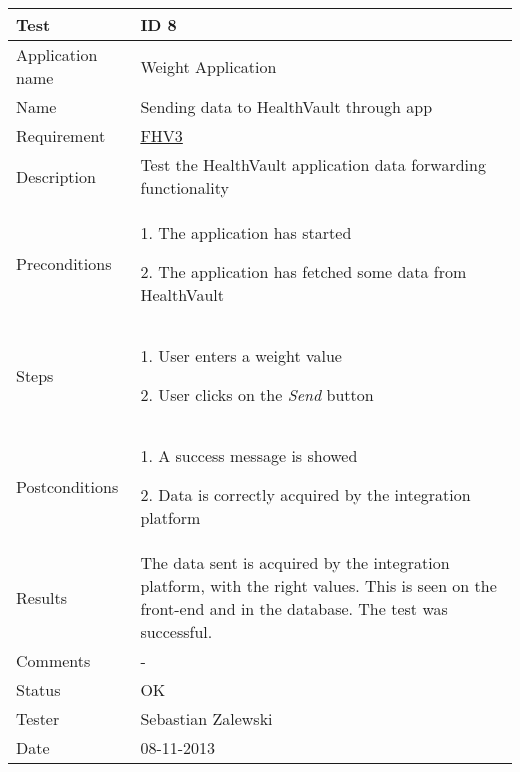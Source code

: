 \begin{table}
\begin{center}
\begin{tabular}{ | l | p{10cm} | }
	\hline
	\textbf{Test}	&	\textbf{ID 8} \\
	\hline\noalign{\smallskip}\noalign{\smallskip}\hline
	Application name	& Weight Application \\
	Name				& Sending data to HealthVault through app \\
	Requirement			& \hyperref[table:reqweight]{FHV3} \\
	Description			& Test the HealthVault application data forwarding functionality \\
	Preconditions		&	\par 1. The application has started
							\par 2. The application has fetched some data from HealthVault \\
	Steps 				&	\par 1. User enters a weight value
							\par 2. User clicks on the \textit{Send} button \\
	Postconditions		&	\par 1. A success message is showed
							\par 2. Data is correctly acquired by the integration platform \\
	Results				& The data sent is acquired by the integration platform, with the right values.
						  This is seen on the front-end and in the database.
						  The test was successful. \\
	Comments			& - \\
	Status				& OK \\
	Tester				& Sebastian Zalewski \\
	Date				& 08-11-2013 \\
	\hline
\end{tabular}
\end{center}
\end{table}

